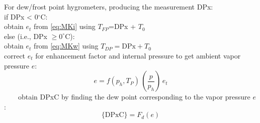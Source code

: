 \documentclass[
]{book}
\begin{document}
For dew/frost point hygrometers, producing the measurement DPx:\\
\hspace*{0.333em}\hspace*{0.333em}\hspace*{0.333em}\hspace*{0.333em}if DPx \textless{} 0\(^\circ\)C:\\
\hspace*{0.333em}\hspace*{0.333em}\hspace*{0.333em}\hspace*{0.333em}\hspace*{0.333em}\hspace*{0.333em}\hspace*{0.333em}\hspace*{0.333em}obtain \(e_{t}\) from \eqref{eq:MKi} using \(T_{FP}\)=DPx + \(T_{0}\)\\
\hspace*{0.333em}\hspace*{0.333em}\hspace*{0.333em}\hspace*{0.333em}else (i.e., DPx \(\geq 0^\circ\)C):\\
\hspace*{0.333em}\hspace*{0.333em}\hspace*{0.333em}\hspace*{0.333em}\hspace*{0.333em}\hspace*{0.333em}\hspace*{0.333em}\hspace*{0.333em}obtain \(e_{t}\) from \eqref{eq:MKw}
using \(T_{DP}=\mathrm{DPx}+T_{0}\)\\
\hspace*{0.333em}\hspace*{0.333em}\hspace*{0.333em}\hspace*{0.333em}correct \(e_{t}\) for enhancement factor and internal pressure
to get ambient vapor pressure \(e\):\\
\begin{equation}
e=f(p_{h},T_{P})\,(\frac{p}{p_{h}})\,e_t
\label{eq:ebox}
\end{equation}
~~~~obtain DPxC by finding the dew point corresponding to the
vapor pressure \(e\):\\
\begin{equation}
\mathrm{\{DPxC\}} = F_{d}(e) 
\label{eq:DPxCbox}
\end{equation}
\end{document}
